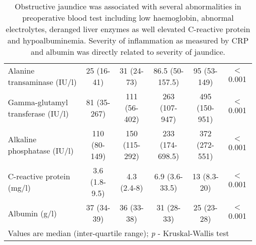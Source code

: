 \begin{sidewaystable}[p]
\begin{tabular}{| l | c c c c c|}
			Alanine transaminase (IU/l)       & 25 (16-41)       & 31 (24-73)       & 86.5 (50-157.5)  & 95 (53-149)      & $<$0.001   \\
			Gamma-glutamyl transferase (IU/l) & 81 (35-267)      & 111 (56-402)     & 263 (107-947)    & 495 (150-951)    & $<$0.001   \\
			Alkaline phosphatase (IU/l)       & 110 (80-149)     & 150 (115-292)    & 233 (174-698.5)  & 372 (272-551)    & $<$0.001   \\
			C-reactive protein (mg/l)         & 3.6 (1.8-9.5)    & 4.3 (2.4-8)      & 6.9 (3.6-33.5)   & 13 (8.3-20)      & $<$0.001   \\
			Albumin (g/l)                     & 37 (34-39)       & 36 (33-38)       & 31 (28-33)       & 25 (23-28)       & $<$0.001   \\ \hline
			\multicolumn{6}{l}{Values are median (inter-quartile range); \textit{p} - Kruskal-Wallis test}
		\end{tabular}
		\medskip
		\caption*{Obstructive jaundice was associated with several abnormalities in preoperative blood test including low haemoglobin, abnormal electrolytes, deranged liver enzymes as well elevated C-reactive protein and hypoalbuminemia. Severity of inflammation as measured by CRP and albumin was directly related to severity of jaundice.}
	\end{sidewaystable}
	
	